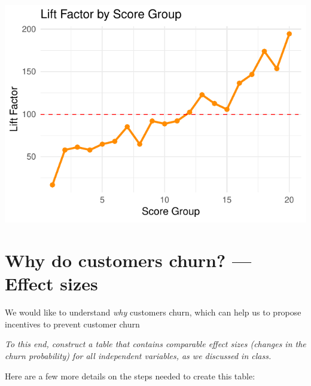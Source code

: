 \documentclass[
]{article}
\begin{document}
\begin{flushright}\includegraphics{p7_files/figure-latex/unnamed-chunk-14-2} \end{flushright}

\newpage

\section{Why do customers churn? --- Effect
sizes}\label{why-do-customers-churn-effect-sizes}

We would like to understand \emph{why} customers churn, which can help
us to propose incentives to prevent customer churn

\emph{To this end, construct a table that contains comparable effect
sizes (changes in the churn probability) for all independent variables,
as we discussed in class.}

Here are a few more details on the steps needed to create this table:
\end{document}
